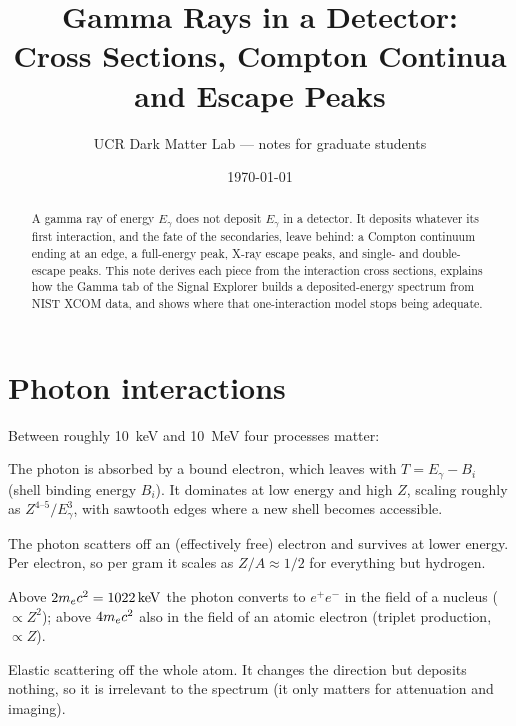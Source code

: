 
\title{Gamma Rays in a Detector:\\ Cross Sections, Compton Continua and Escape Peaks}
\author{UCR Dark Matter Lab --- notes for graduate students}
\date{\today}

\maketitle
\seriesnote

\begin{abstract}
A gamma ray of energy $E_\gamma$ does not deposit $E_\gamma$ in a detector. It deposits whatever its first interaction, and the fate of the secondaries, leave behind: a Compton continuum ending at an edge, a full-energy peak, X-ray escape peaks, and single- and double-escape peaks. This note derives each piece from the interaction cross sections, explains how the Gamma tab of the Signal Explorer builds a deposited-energy spectrum from NIST XCOM data, and shows where that one-interaction model stops being adequate.
\end{abstract}
\tableofcontents

\section{Photon interactions}
Between roughly \SI{10}{keV} and \SI{10}{MeV} four processes matter:
\begin{description}[leftmargin=1.5em]
\item[Photoelectric absorption] The photon is absorbed by a bound electron, which leaves with $T = E_\gamma - B_i$ (shell binding energy $B_i$). It dominates at low energy and high $Z$, scaling roughly as $Z^{4\text{--}5}/E_\gamma^{3}$, with sawtooth edges where a new shell becomes accessible.
\item[Incoherent (Compton) scattering] The photon scatters off an (effectively free) electron and survives at lower energy. Per electron, so per gram it scales as $Z/A \approx 1/2$ for everything but hydrogen.
\item[Pair production] Above $2m_e c^2 = \SI{1022}{keV}$ the photon converts to $e^+e^-$ in the field of a nucleus ($\propto Z^2$); above $4m_e c^2$ also in the field of an atomic electron (triplet production, $\propto Z$).
\item[Coherent (Rayleigh) scattering] Elastic scattering off the whole atom. It changes the direction but deposits nothing, so it is irrelevant to the spectrum (it only matters for attenuation and imaging).
\end{description}

